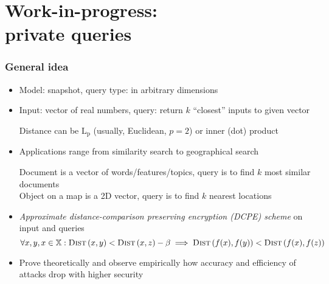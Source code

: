 \section{Work-in-progress: \\ private \knn{} queries}

	\begin{frame}[label={frame:knn}]

		\frametitle{General idea}

		\begin{itemize}
			\item<1->
				Model: \alert{snapshot}, query type: \alert{\knn{}} in arbitrary dimensions

			\item<2->
				Input: vector of real numbers, query: return $k$ ``closest'' inputs to given vector \\
				\begin{small}
					Distance can be $\text{L}_\text{p}$ (usually, Euclidean, $p = 2$) or inner (dot) product
				\end{small}

			\item<3->
				Applications range from similarity search to geographical search \\
				\begin{small}
					Document is a vector of words/features/topics, query is to find $k$ most similar documents \\
					Object on a map is a 2D vector, query is to find $k$ nearest locations
				\end{small}

			\item<4->
				\emph{Approximate distance-comparison preserving encryption (DCPE) scheme} on input and queries
				\[
					\forall x, y, x \in \mathbb{X} : \algo{Dist}{x, y} < \algo{Dist}{x, z} - \beta \implies \algo{Dist}{f(x), f(y)} < \algo{Dist}{f(x), f(z)}
				\]

			\item<5->
				Prove theoretically and observe empirically how accuracy and efficiency of attacks drop with higher security \\
				\begin{small}
					\hyperlink{frame:appendix:dcpe}{}
					\hyperlink{frame:appendix:trec-faiss}{}
					\hyperlink{frame:appendix:knn-plot}{}
				\end{small}

		\end{itemize}

	\end{frame}

